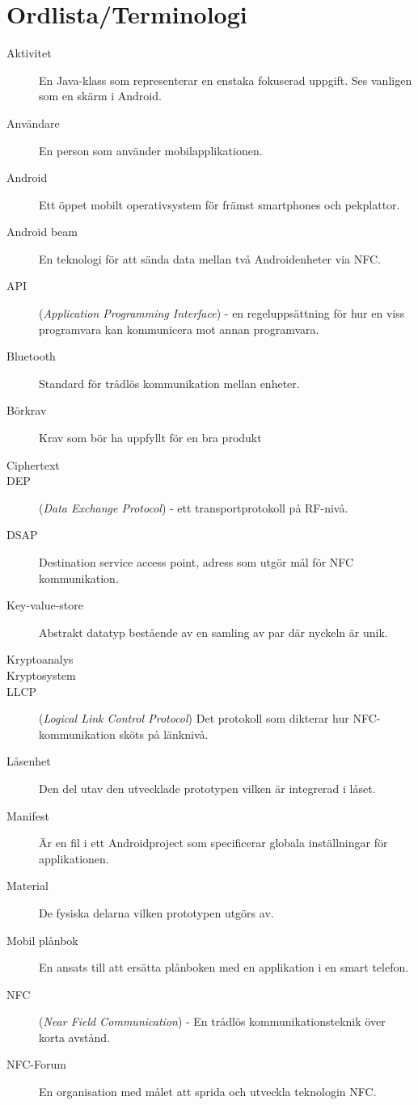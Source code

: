 \documentclass[11pt]{article}
\begin{document}
\section*{Ordlista/Terminologi}
\begin{description}
\item[Aktivitet] En Java-klass som representerar en enstaka fokuserad uppgift. Ses vanligen som en skärm i Android.
\item[Användare] En person som använder mobilapplikationen.
\item[Android] Ett öppet mobilt operativsystem för främst smartphones och pekplattor.
\item[Android beam] En teknologi för att sända data mellan två Androidenheter via NFC.
\item[API] (\textit{Application Programming Interface}) - en regeluppsättning för hur en viss programvara kan kommunicera mot annan programvara.
\item[Bluetooth] Standard för trådlös kommunikation mellan enheter.
\item[Börkrav] Krav som bör ha uppfyllt för en bra produkt
\item[Ciphertext] 
\item[DEP](\textit{Data Exchange Protocol}) - ett transportprotokoll på RF-nivå.
\item[DSAP] Destination service access point, adress som utgör mål för NFC kommunikation.
\item[Key-value-store] Abstrakt datatyp bestående av en samling av par där nyckeln är unik.
\item[Kryptoanalys]
\item[Kryptosystem] 
\item[LLCP](\textit{Logical Link Control Protocol})  Det protokoll som dikterar hur NFC-kommunikation sköts på länknivå.
\item[Låsenhet] Den del utav den utvecklade prototypen vilken är integrerad i låset.
\item[Manifest] Är en fil i ett Androidproject som specificerar globala inställningar för applikationen.
\item[Material] De fysiska delarna vilken prototypen utgörs av.
\item[Mobil plånbok] En ansats till att ersätta plånboken med en applikation i en smart telefon.
\item[NFC] (\textit{Near Field Communication}) - En trådlös kommunikationsteknik över korta avstånd. 
\item[NFC-Forum] En organisation med målet att sprida och utveckla teknologin NFC.

\end{description}
\end{document}
